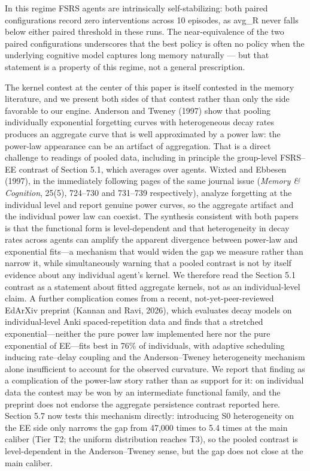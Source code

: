 \documentclass[11pt]{article}
\begin{document}
In this regime FSRS agents are intrinsically self-stabilizing: both paired configurations record zero interventions across 10 episodes, as avg\_R never falls below either paired threshold in these runs. The near-equivalence of the two paired configurations underscores that the best policy is often no policy when the underlying cognitive model captures long memory naturally --- but that statement is a property of this regime, not a general prescription.

The kernel contest at the center of this paper is itself contested in the memory literature, and we present both sides of that contest rather than only the side favorable to our engine. Anderson and Tweney (1997) show that pooling individually exponential forgetting curves with heterogeneous decay rates produces an aggregate curve that is well approximated by a power law: the power-law appearance can be an artifact of aggregation. That is a direct challenge to readings of pooled data, including in principle the group-level FSRS--EE contrast of Section 5.1, which averages over agents. Wixted and Ebbesen (1997), in the immediately following pages of the same journal issue (\textit{Memory \& Cognition}, 25(5), 724--730 and 731--739 respectively), analyze forgetting at the individual level and report genuine power curves, so the aggregate artifact and the individual power law can coexist. The synthesis consistent with both papers is that the functional form is level-dependent and that heterogeneity in decay rates across agents can amplify the apparent divergence between power-law and exponential fits---a mechanism that would widen the gap we measure rather than narrow it, while simultaneously warning that a pooled contrast is not by itself evidence about any individual agent's kernel. We therefore read the Section 5.1 contrast as a statement about fitted aggregate kernels, not as an individual-level claim. A further complication comes from a recent, not-yet-peer-reviewed EdArXiv preprint (Kannan and Ravi, 2026), which evaluates decay models on individual-level Anki spaced-repetition data and finds that a stretched exponential---neither the pure power law implemented here nor the pure exponential of EE---fits best in 76\% of individuals, with adaptive scheduling inducing rate--delay coupling and the Anderson--Tweney heterogeneity mechanism alone insufficient to account for the observed curvature. We report that finding as a complication of the power-law story rather than as support for it: on individual data the contest may be won by an intermediate functional family, and the preprint does not endorse the aggregate persistence contrast reported here. Section 5.7 now tests this mechanism directly: introducing S0 heterogeneity on the EE side only narrows the gap from 47,000 times to 5.4 times at the main caliber (Tier T2; the uniform distribution reaches T3), so the pooled contrast is level-dependent in the Anderson--Tweney sense, but the gap does not close at the main caliber.
\end{document}

